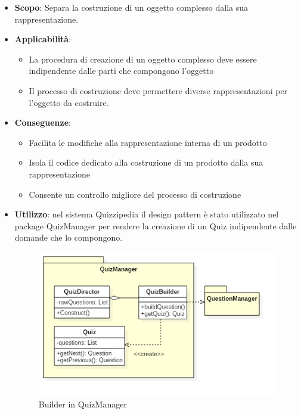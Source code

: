 	\begin{itemize}
		\item\textbf{Scopo}: Separa la costruzione di un oggetto complesso dalla sua rappresentazione.
		\item\textbf{Applicabilità}:
		\begin{itemize}
			\item La procedura di creazione di un oggetto complesso
deve essere indipendente dalle parti che
compongono l'oggetto
			\item Il processo di costruzione deve permettere diverse
rappresentazioni per l'oggetto da costruire.
		\end{itemize}
		\item\textbf{Conseguenze}:
		\begin{itemize}
			\item Facilita le modifiche alla rappresentazione interna di
un prodotto
			\item Isola il codice dedicato alla costruzione di un prodotto
dalla sua rappresentazione
			\item Consente un controllo migliore del processo di
costruzione
		\end{itemize}
		\item\textbf{Utilizzo}: nel sistema Quizzipedia il design pattern è stato utilizzato nel package QuizManager per rendere la creazione di un Quiz indipendente dalle domande che lo compongono.
		\begin{figure}[h!]
	\begin{center}
		\includegraphics[scale=0.54]{../images/QuizManagerClass.png}
		\caption{Builder in QuizManager}
	\end{center}
	\end{figure}
	\end{itemize}
	\newpage
	
